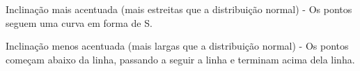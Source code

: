 \begin{frame}
{
\justifying
Inclinação mais acentuada (mais estreitas que a distribuição normal) - Os pontos seguem uma curva em forma de S.
}

{
\justifying
Inclinação menos acentuada (mais largas que a distribuição normal) - Os pontos começam abaixo da linha, passando a seguir a linha e terminam acima dela linha.
}

\end{frame}


